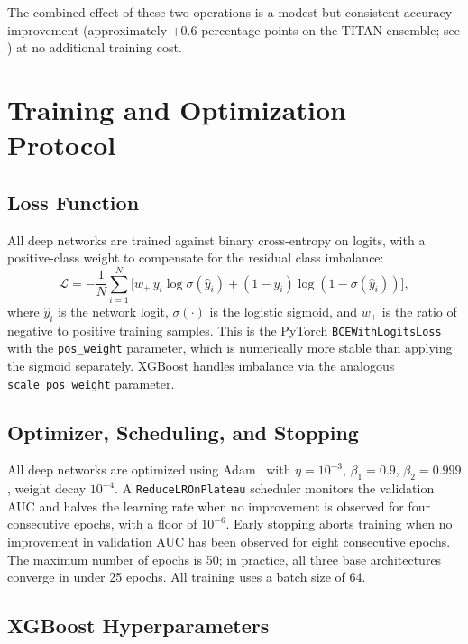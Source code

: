 The combined effect of these two operations is a modest but consistent accuracy improvement (approximately +0.6 percentage points on the TITAN ensemble; see ) at no additional training cost.

\section{Training and Optimization Protocol}

\subsection{Loss Function}

All deep networks are trained against binary cross-entropy on logits, with a positive-class weight to compensate for the residual class imbalance:
\begin{equation}
\mathcal{L} = -\frac{1}{N}\sum_{i=1}^{N} \bigl[ w_{+}\, y_i \log \sigma(\hat{y}_i) + (1 - y_i)\log(1 - \sigma(\hat{y}_i)) \bigr],
\end{equation}
where $\hat{y}_i$ is the network logit, $\sigma(\cdot)$ is the logistic sigmoid, and $w_{+}$ is the ratio of negative to positive training samples. This is the PyTorch \texttt{BCEWithLogitsLoss} with the \texttt{pos\_weight} parameter, which is numerically more stable than applying the sigmoid separately. XGBoost handles imbalance via the analogous \texttt{scale\_pos\_weight} parameter.

\subsection{Optimizer, Scheduling, and Stopping}

All deep networks are optimized using Adam~\cite{kingma2015adam} with $\eta = 10^{-3}$, $\beta_1 = 0.9$, $\beta_2 = 0.999$, weight decay $10^{-4}$. A \texttt{ReduceLROnPlateau} scheduler monitors the validation AUC and halves the learning rate when no improvement is observed for four consecutive epochs, with a floor of $10^{-6}$. Early stopping aborts training when no improvement in validation AUC has been observed for eight consecutive epochs. The maximum number of epochs is 50; in practice, all three base architectures converge in under 25 epochs. All training uses a batch size of 64.

\subsection{XGBoost Hyperparameters}

